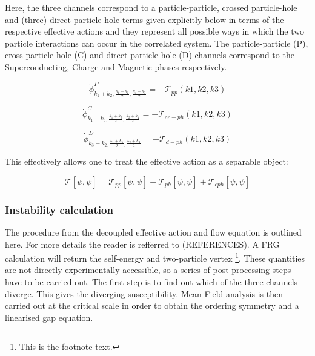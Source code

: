 \documentclass[12pt]{article}
\begin{document}
\noindent Here, the three channels correspond to a particle-particle, crossed particle-hole and (three) direct particle-hole terms given explicitly below in terms of the respective effective actions and they represent all possible ways in which the two particle interactions can occur in the correlated system. The particle-particle (P), cross-particle-hole (C) and direct-particle-hole (D) channels
correspond to the Superconducting, Charge and Magnetic phases respectively. 

\begin{equation}
    \dot{\phi}^{P}_{k_1 +k_2, \frac{k_1 - k_2}{2}, \frac{k_4-k_3}{2}} = - \mathcal{T}_{pp}(k1,k2,k3)
\end{equation}


\begin{equation}
    \dot{\phi}^{C}_{k_1 - k_3, \frac{k_1 +k_3}{2}, \frac{k_2+k_4}{2}} = - \mathcal{T}_{cr-ph}(k1,k2,k3)
\end{equation}

\begin{equation}
    \dot{\phi}^{D}_{k_3- k_2, \frac{k_1 + k_4}{2}, \frac{k_2+k_3}{2}} = - \mathcal{T}_{d-ph}(k1,k2,k3)
\end{equation}

\noindent This effectively allows one to treat the effective action as a separable object:

\begin{equation}
    \mathcal{T}[\psi, \bar{\psi}] = \mathcal{T}_{pp}[\psi, \bar{\psi}] + \mathcal{T}_{ph}[\psi, \bar{\psi}] + \mathcal{T}_{cph}[\psi, \bar{\psi}]
\end{equation}

\medskip





\subsubsection{Instability calculation}

The procedure from the decoupled  effective action and flow equation is outlined here. For more details the reader is refferred to (REFERENCES). 
A FRG calculation will return the self-energy and two-particle vertex \footnote{This is the footnote text.}. These quantities are
not directly experimentally accessible, so a series of post processing steps have to be carried out. The first step is to find out which of the three channels diverge. 
This gives the diverging susceptibility. Mean-Field analysis is then carried out at the critical scale in order to obtain
the ordering symmetry and a linearised gap equation. 
\end{document}
